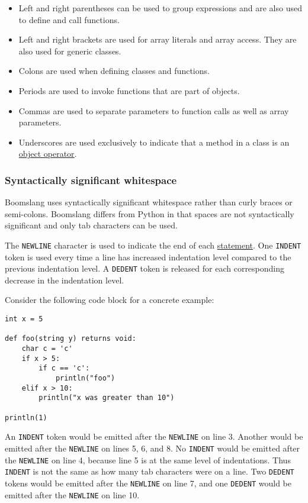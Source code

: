 \documentclass{article}
\begin{document}
\begin{itemize}
\item Left and right parentheses can be used to group expressions and are also used to define and call functions.

\item Left and right brackets are used for array literals and array access. They are also used for generic classes.

\item Colons are used when defining classes and functions.

\item Periods are used to invoke functions that are part of objects.

\item Commas are used to separate parameters to function calls as well as array parameters.

\item Underscores are used exclusively to indicate that a method in a class is an \hyperref[sec:object-operators]{object operator}.
\end{itemize}

\subsubsection{Syntactically significant whitespace}
Boomslang uses syntactically significant whitespace rather than curly braces or semi-colons. Boomslang differs from Python in that spaces are not syntactically significant and only tab characters can be used.

The \texttt{NEWLINE} character is used to indicate the end of each \hyperref[sec:stmt]{statement}. One \texttt{INDENT} token is used every time a line has increased indentation level compared to the previous indentation level. A \texttt{DEDENT} token is released for each corresponding decrease in the indentation level. 

Consider the following code block for a concrete example:
\begin{verbatim}
int x = 5

def foo(string y) returns void:
    char c = 'c'
    if x > 5:
        if c == 'c':
            println("foo")
    elif x > 10:
        println("x was greater than 10")
        
println(1)

\end{verbatim}
An \texttt{INDENT} token would be emitted after the \texttt{NEWLINE} on line 3. Another would be emitted after the \texttt{NEWLINE} on lines 5, 6, and 8. No \texttt{INDENT} would be emitted after the \texttt{NEWLINE} on line 4, because line 5 is at the same level of indentations. Thus \texttt{INDENT} is not the same as how many tab characters were on a line. Two \texttt{DEDENT} tokens would be emitted after the \texttt{NEWLINE} on line 7, and one \texttt{DEDENT} would be emitted after the \texttt{NEWLINE} on line 10.
\end{document}
